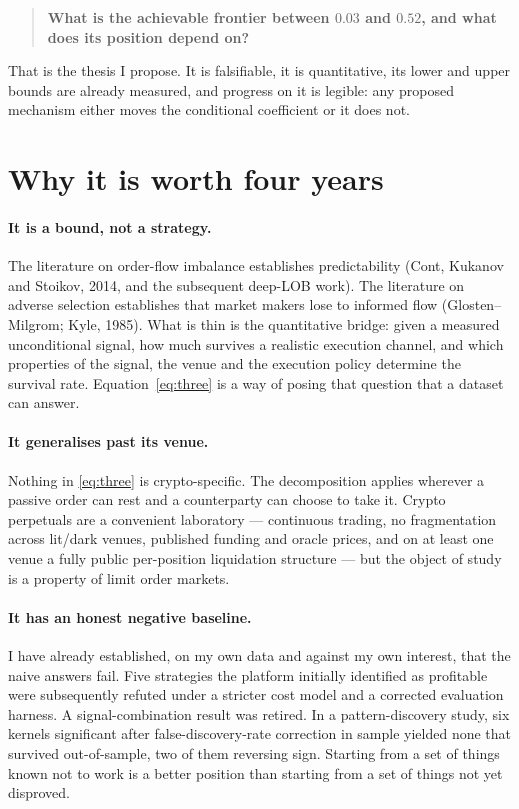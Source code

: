 \documentclass[11pt,a4paper]{article}
\begin{document}
\begin{quote}
\textbf{What is the achievable frontier between $0.03$ and $0.52$, and what does its position depend
on?}
\end{quote}

That is the thesis I propose. It is falsifiable, it is quantitative, its lower and upper bounds are
already measured, and progress on it is legible: any proposed mechanism either moves the conditional
coefficient or it does not.

\section{Why it is worth four years}

\paragraph{It is a bound, not a strategy.} The literature on order-flow imbalance establishes
predictability (Cont, Kukanov and Stoikov, 2014, and the subsequent deep-LOB work). The literature
on adverse selection establishes that market makers lose to informed flow (Glosten--Milgrom;
Kyle, 1985). What is thin is the quantitative bridge: given a measured unconditional signal, how much
survives a realistic execution channel, and which properties of the signal, the venue and the
execution policy determine the survival rate. Equation~\eqref{eq:three} is a way of posing that
question that a dataset can answer.

\paragraph{It generalises past its venue.} Nothing in \eqref{eq:three} is crypto-specific. The
decomposition applies wherever a passive order can rest and a counterparty can choose to take it.
Crypto perpetuals are a convenient laboratory --- continuous trading, no fragmentation across
lit/dark venues, published funding and oracle prices, and on at least one venue a fully public
per-position liquidation structure --- but the object of study is a property of limit order markets.

\paragraph{It has an honest negative baseline.} I have already established, on my own data and
against my own interest, that the naive answers fail. Five strategies the platform initially
identified as profitable were subsequently refuted under a stricter cost model and a corrected
evaluation harness. A signal-combination result was retired. In a pattern-discovery study, six
kernels significant after false-discovery-rate correction in sample yielded none that survived
out-of-sample, two of them reversing sign. Starting from a set of things known not to work is a
better position than starting from a set of things not yet disproved.
\end{document}
